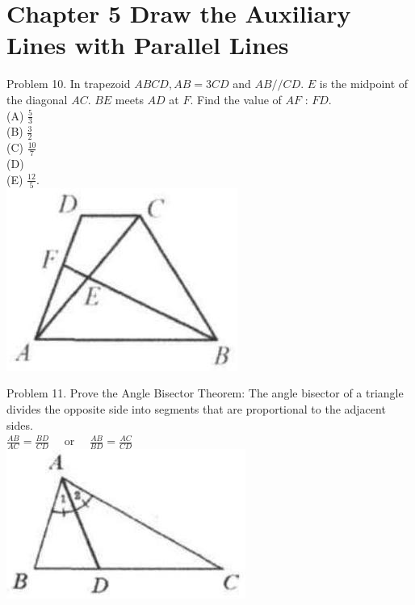 \documentclass[10pt]{article}
\begin{document}
\section*{Chapter 5 Draw the Auxiliary Lines with Parallel Lines}
Problem 10. In trapezoid \(A B C D, A B=3 C D\) and \(A B / / C D\). \(E\) is the midpoint of the diagonal \(A C\). \(B E\) meets \(A D\) at \(F\). Find the value of \(A F\) : \(F D\).\\
(A) \(\frac{5}{3}\)\\
(B) \(\frac{3}{2}\)\\
(C) \(\frac{10}{7}\)\\
(D)\\
(E) \(\frac{12}{5}\).\\
\includegraphics[max width=\textwidth, center]{2025_04_17_97bc1f7e44d93c271a88g-128}

Problem 11. Prove the Angle Bisector Theorem: The angle bisector of a triangle divides the opposite side into segments that are proportional to the adjacent sides.\\
\(\frac{A B}{A C}=\frac{B D}{C D} \quad\) or \(\quad \frac{A B}{B D}=\frac{A C}{C D}\)\\
\includegraphics[max width=\textwidth, center]{2025_04_17_97bc1f7e44d93c271a88g-128(2)}
\end{document}
